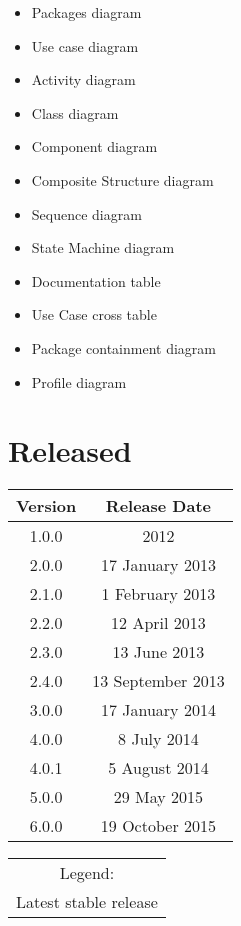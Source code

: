\begin{itemize}
\item Packages diagram
\item Use case diagram
\item Activity diagram
\item Class diagram
\item Component diagram
\item Composite Structure diagram
\item Sequence diagram
\item State Machine diagram
\item Documentation table
\item Use Case cross table
\item Package containment diagram
\item Profile diagram
\end{itemize}



\section{Released}
\begin{center}

  \begin{tabular}{|c|c|}
    \hline
    \textbf{Version} & \textbf{Release Date} \\
    \hline
    1.0.0 &2012\\
    \hline
    2.0.0 &17 January 2013\\
    \hline
    2.1.0 &1 February 2013\\
    \hline
    2.2.0 &12 April 2013\\
    \hline
    2.3.0 &13 June 2013\\
    \hline
    2.4.0 &13 September 2013\\
    \hline
    3.0.0 &17 January 2014\\
    \hline
    4.0.0 &8 July 2014\\
    \hline
    4.0.1 &5 August 2014\\
    \hline
    5.0.0 &29 May 2015\\
    \hline
    \cellcolor{green}6.0.0 &19 October 2015\\
    \hline
  \end{tabular}

  \begin{tabular}{c}
    Legend:\\
    \cellcolor{green}Latest stable release\\
  \end{tabular}

\end{center}


